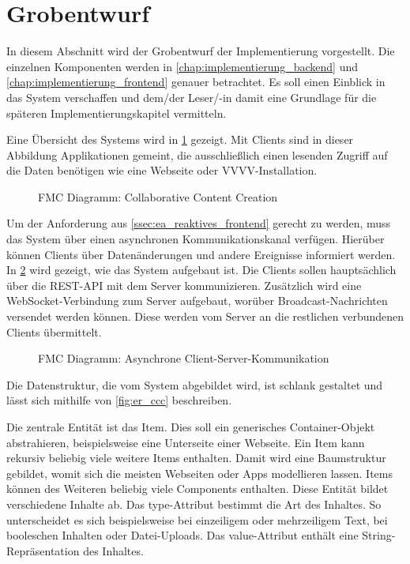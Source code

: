 \section{Grobentwurf}
\label{sec:k_grobentwurf}

In diesem Abschnitt wird der Grobentwurf der Implementierung vorgestellt.  Die
einzelnen Komponenten werden in \cref{chap:implementierung_backend} und
\ref{chap:implementierung_frontend} genauer betrachtet.  Es soll einen Einblick
in das System verschaffen und dem/der Leser/-in damit eine Grundlage für die
späteren Implementierungskapitel vermitteln.

Eine Übersicht des Systems wird in \cref{fig:fmc_ccc} gezeigt.  Mit Clients
sind in dieser Abbildung Applikationen gemeint, die ausschließlich einen
lesenden Zugriff auf die Daten benötigen wie eine Webseite oder
VVVV-Installation.

\begin{figure}
    \centering
    
    \caption{FMC Diagramm: Collaborative Content Creation}
    \label{fig:fmc_ccc}
\end{figure}

Um der Anforderung aus \cref{ssec:ea_reaktives_frontend} gerecht zu werden, muss
das System über einen asynchronen Kommunikationskanal verfügen.  Hierüber können
Clients über Datenänderungen und andere Ereignisse informiert werden.  In
\cref{fig:fmc_async_client_server} wird gezeigt, wie das System aufgebaut ist.
Die Clients sollen hauptsächlich über die REST-API mit dem Server
kommunizieren.  Zusätzlich wird eine WebSocket-Verbindung zum Server aufgebaut,
worüber Broadcast-Nachrichten versendet werden können.  Diese werden vom Server
an die restlichen verbundenen Clients übermittelt.

\begin{figure}
    \centering
    
    \caption{FMC Diagramm: Asynchrone Client-Server-Kommunikation}
    \label{fig:fmc_async_client_server}
\end{figure}

Die Datenstruktur, die vom System abgebildet wird, ist schlank gestaltet und
lässt sich mithilfe von \cref{fig:er_ccc} beschreiben.

Die zentrale Entität ist das Item.  Dies soll ein generisches Container-Objekt
abstrahieren, beispielsweise eine Unterseite einer Webseite.  Ein Item kann
rekursiv beliebig viele weitere Items enthalten.  Damit wird eine Baumstruktur
gebildet, womit sich die meisten Webseiten oder Apps modellieren lassen.  Items
können des Weiteren beliebig viele Components enthalten.  Diese Entität bildet
verschiedene Inhalte ab.  Das type-Attribut bestimmt die Art des Inhaltes. So
unterscheidet es sich beispielsweise bei einzeiligem oder mehrzeiligem Text, bei
booleschen Inhalten oder Datei-Uploads.  Das value-Attribut enthält eine
String-Repräsentation des Inhaltes.

